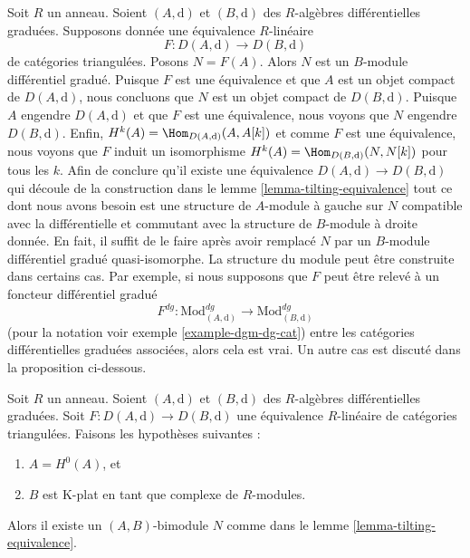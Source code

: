 \begin{remark}
\label{remark-lift-equivalence-to-dga}
Soit $R$ un anneau. Soient $(A, \text{d})$ et $(B, \text{d})$ des $R$-algèbres
différentielles graduées. Supposons donnée une équivalence $R$-linéaire
$$
F : D(A, \text{d}) \longrightarrow D(B, \text{d})
$$
de catégories triangulées. Posons $N = F(A)$. Alors $N$ est un $B$-module
différentiel gradué. Puisque $F$ est une équivalence et que $A$ est un objet
compact de $D(A, \text{d})$, nous concluons que $N$ est un objet compact de
$D(B, \text{d})$. Puisque $A$ engendre $D(A, \text{d})$ et que $F$ est
une équivalence, nous voyons que $N$ engendre $D(B, \text{d})$. Enfin,
$H^k(A) = \Hom_{D(A, \text{d})}(A, A[k])$ et comme $F$ est une équivalence, nous voyons
que $F$ induit un isomorphisme $H^k(A) =
\Hom_{D(B, \text{d})}(N, N[k])$ pour tous les $k$. Afin de
conclure qu'il existe une équivalence $D(A, \text{d})
\longrightarrow D(B, \text{d})$ qui découle de la construction dans
le lemme
\ref{lemma-tilting-equivalence} tout ce dont nous avons besoin est
une structure de $A$-module à gauche sur $N$ compatible
avec la différentielle et commutant avec la
structure de $B$-module à droite donnée. En fait, il suffit de
le faire après avoir remplacé $N$ par un $B$-module différentiel
gradué quasi-isomorphe. La structure du
module peut être construite dans certains cas. Par exemple, si
nous supposons que $F$ peut être relevé à un foncteur
différentiel gradué
$$
F^{dg} :
\text{Mod}^{dg}_{(A, \text{d})}
\longrightarrow
\text{Mod}^{dg}_{(B, \text{d})}
$$
(pour la notation voir exemple \ref{example-dgm-dg-cat})
entre les catégories différentielles graduées associées,
alors cela est vrai. Un autre cas est discuté dans la proposition ci-dessous.
\end{remark}

\begin{proposition}
\label{proposition-rickard}
Soit $R$ un anneau. Soient $(A, \text{d})$ et $(B, \text{d})$ des
$R$-algèbres différentielles graduées. Soit $F : D(A, \text{d}) \to D(B, \text{d})$ une
équivalence $R$-linéaire de catégories triangulées. Faisons les hypothèses suivantes :
\begin{enumerate}
\item $A = H^0(A)$, et
\item $B$ est K-plat en tant que complexe de $R$-modules.
\end{enumerate}
Alors il existe un $(A, B)$-bimodule $N$ comme dans
le lemme \ref{lemma-tilting-equivalence}.
\end{proposition}

